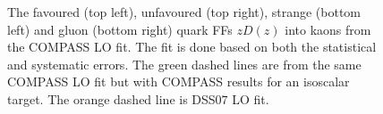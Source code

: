 \begin{figure}[!h]
	\caption{The favoured (top left), unfavoured (top right), strange (bottom left) and gluon (bottom right) quark FFs $zD(z)$ into kaons from the COMPASS LO fit. The fit is done based on both the statistical and systematic errors. The green dashed lines are from the same COMPASS LO fit but with COMPASS results for an isoscalar target. The orange dashed line is DSS$07$ LO fit.}
	\label{pic:FFFit}
\end{figure}

